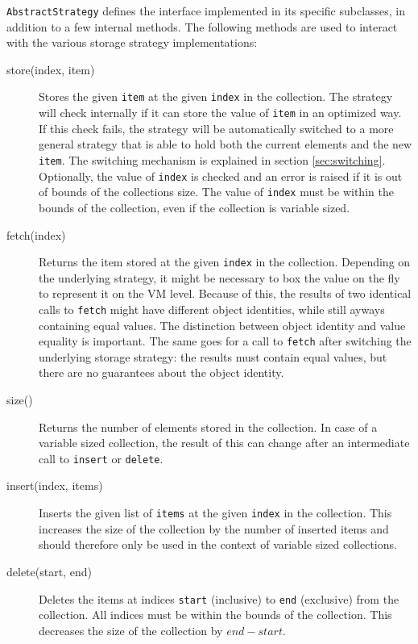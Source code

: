 \documentclass[english,10pt]{sigplanconf}
\begin{document}
\lstinline{AbstractStrategy} defines the interface implemented in its
specific subclasses, in addition to a few internal methods.  The
following methods are used to interact with the various storage
strategy implementations:

\begin{description}
\item[store(index, item)]{Stores the given \lstinline{item} at the
    given \lstinline{index} in the collection.  The strategy will
    check internally if it can store the value of \lstinline{item} in
    an optimized way.  If this check fails, the strategy will be
    automatically switched to a more general strategy that is able to
    hold both the current elements and the new \lstinline{item}.  The
    switching mechanism is explained in section \ref{sec:switching}.
    Optionally, the value of \lstinline{index} is checked and an error
    is raised if it is out of bounds of the collections size.  The
    value of \lstinline{index} must be within the bounds of the
    collection, even if the collection is variable sized.  }
\item[fetch(index)]{Returns the item stored at the given
    \lstinline{index} in the collection.  Depending on the underlying
    strategy, it might be necessary to box the value on the fly to
    represent it on the VM level.  Because of this, the results of two
    identical calls to \lstinline{fetch} might have different object
    identities, while still ayways containing equal values.  The
    distinction between object identity and value equality is
    important.  The same goes for a call to \lstinline{fetch} after
    switching the underlying storage strategy: the results must
    contain equal values, but there are no guarantees about the object
    identity.  }
\item[size()]{Returns the number of elements stored in the collection.
    In case of a variable sized collection, the result of this can
    change after an intermediate call to \lstinline{insert} or
    \lstinline{delete}.}
\item[insert(index, items)]{Inserts the given list of
    \lstinline{items} at the given \lstinline{index} in the
    collection.  This increases the size of the collection by the
    number of inserted items and should therefore only be used in the
    context of variable sized collections.}
\item[delete(start, end)]{Deletes the items at indices
    \lstinline{start} (inclusive) to \lstinline{end} (exclusive) from
    the collection.  All indices must be within the bounds of the
    collection.  This decreases the size of the collection by
    $end-start$.}
\end{description}
\end{document}
